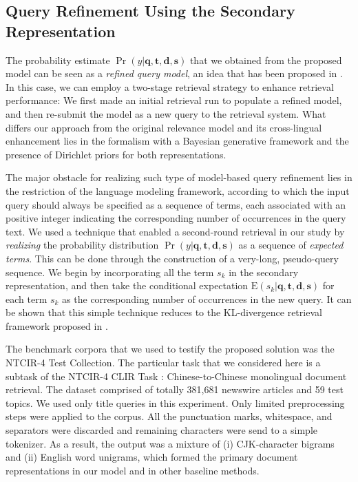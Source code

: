 \subsection{Query Refinement Using the Secondary
Representation}\label{s:query-modeling}

The probability estimate $\Pr(y|\mathbf{q}, \mathbf{t}, \mathbf{d},
\mathbf{s})$ that we obtained from the proposed model can be seen as a
\emph{refined query model}, an idea that has been proposed in
\cite{lavrenko2001relevance}.  In this case, we can employ a two-stage
retrieval strategy to enhance retrieval performance: We first made an initial
retrieval run to populate a refined model, and then re-submit the model as a
new query to the retrieval system.  What differs our approach from the original
relevance model \cite{lavrenko2001relevance} and its cross-lingual enhancement
\cite{lavrenko2002cross-lingual} lies in the formalism with a Bayesian
generative framework and the presence of Dirichlet priors for both
representations.

The major obstacle for realizing such type of model-based query refinement lies
in the restriction of the language modeling framework, according to which the
input query should always be specified as a sequence of terms, each associated
with an positive integer indicating the corresponding number of occurrences in
the query text.  We used a technique that enabled a second-round retrieval
in our study by \emph{realizing} the probability distribution
$\Pr(y|\mathbf{q}, \mathbf{t}, \mathbf{d}, \mathbf{s})$ as a sequence of
\emph{expected terms}.  This can be done through the construction of a
very-long, pseudo-query sequence.  We begin by incorporating all the term $s_k$
in the secondary representation, and then take the conditional expectation
$\mathrm{E}(s_k|\mathbf{q}, \mathbf{t}, \mathbf{d}, \mathbf{s})$ for each term
$s_k$ as the corresponding number of occurrences in the new query.  It can be
shown that this simple technique reduces to the KL-divergence retrieval
framework proposed in \cite{zhai2001language}. 

The benchmark corpora that we used to testify the proposed solution was the
NTCIR-4 Test Collection.  The particular task that we considered here is a
subtask of the NTCIR-4 CLIR Task \cite{kishida2004overview}: Chinese-to-Chinese monolingual document
retrieval.  The dataset comprised of totally 381,681 newswire articles and 59
test topics.  We used only title queries in this experiment.  Only limited
preprocessing steps were applied to the corpus.  All the punctuation marks,
whitespace, and separators were discarded and remaining characters were send to
a simple tokenizer.  As a result, the output was a mixture of (i) CJK-character
bigrams and (ii) English word unigrams, which formed the primary document
representations in our model and in other baseline methods.  

